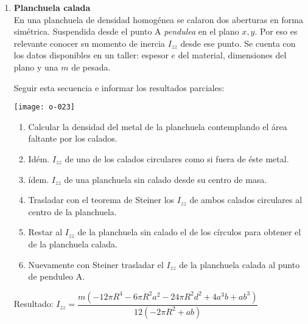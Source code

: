 \documentclass[11pt, spanish, a4paper, twoside]{article}
\begin{document}
\begin{enumerate}
	\item 
		\begin{minipage}[t][4cm]{0.49\textwidth}
			\textbf{Planchuela calada}\\
			En una planchuela de densidad homogénea se calaron dos aberturas en forma simétrica.
			Suspendida desde el punto A \emph{pendulea} en el plano \(x,y\).
			Por eso es relevante conocer su momento de inercia \(I_{zz}\) desde ese punto.
			Se cuenta con los datos disponibles en un taller: espesor $e$ del material, dimensiones del plano y una $m$ de pesada. 

			Seguir esta secuencia e informar los resultados parciales:			
		\end{minipage}
		\begin{minipage}[c][2cm][t]{0.45\textwidth}
			\texttt{[image: o-023]}
		\end{minipage}
			\begin{enumerate}
				\item Calcular la densidad del metal de la planchuela contemplando el área faltante por los calados.
				\item Idém. \(I_{zz}\) de uno de los calados circulares como si fuera de éste metal.
				\item ídem. \(I_{zz}\) de una planchuela sin calado desde su centro de masa.
				\item Trasladar con el teorema de Steiner los \(I_{zz}\) de ambos calados circulares al centro de la planchuela.
				\item Restar al \(I_{zz}\) de la planchuela sin calado el de los círculos para obtener el de la planchuela calada.
				\item Nuevamente con Steiner trasladar el \(I_{zz}\) de la planchuela calada al punto de penduleo A.
			\end{enumerate}


			Resultado: 
			\(
			I_{zz} = \dfrac{m \left(- 12 \pi R^{4} - 6 \pi R^{2} a^{2} - 24 \pi R^{2} d^{2} + 4 a^{3} b + a b^{3}\right)}{12 \left(- 2 \pi R^{2} + a b\right)}
			\) 



\end{enumerate}
\end{document}
